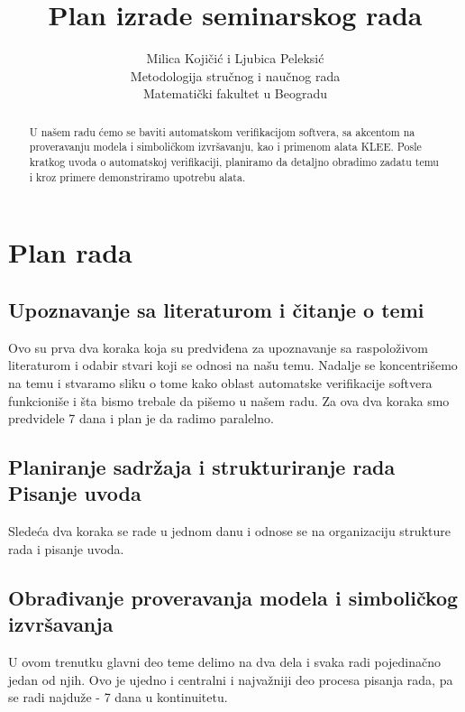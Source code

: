 \documentclass{article}
\begin{document}
	\title{Plan izrade seminarskog rada}

	\author{Milica Kojičić i Ljubica Peleksić\\
		Metodologija stručnog i naučnog rada\\
		Matematički fakultet u Beogradu
		}
	\maketitle

	\begin{abstract}
		U našem radu ćemo se baviti automatskom verifikacijom softvera, sa akcentom na proveravanju modela i simboličkom izvršavanju, kao i primenom alata KLEE. Posle kratkog uvoda o automatskoj verifikaciji, planiramo da detaljno obradimo zadatu temu i kroz primere demonstriramo upotrebu alata.
	\end{abstract}

	\section{Plan rada}
	
	\subsection{Upoznavanje sa literaturom i čitanje o temi}
	Ovo su prva dva koraka koja su predviđena za upoznavanje sa raspoloživom literaturom i odabir stvari koji 		se odnosi na našu temu. Nadalje se koncentrišemo na temu i stvaramo sliku o tome kako oblast automatske 		verifikacije softvera funkcioniše i šta bismo trebale da pišemo u našem radu. Za ova dva koraka smo 			predvidele 7 dana i plan je da radimo paralelno.
	
	\subsection{Planiranje sadržaja i strukturiranje rada \\ Pisanje uvoda}
		Sledeća dva koraka se rade u jednom danu i odnose se na organizaciju strukture rada i pisanje uvoda. 
	
	\subsection{Obrađivanje proveravanja modela i simboličkog izvršavanja}
		U ovom trenutku glavni deo teme delimo na dva dela i svaka radi pojedinačno jedan od njih. Ovo je ujedno i centralni i najvažniji deo procesa pisanja rada, pa se radi najduže - 7 dana u kontinuitetu.
		
\end{document}
